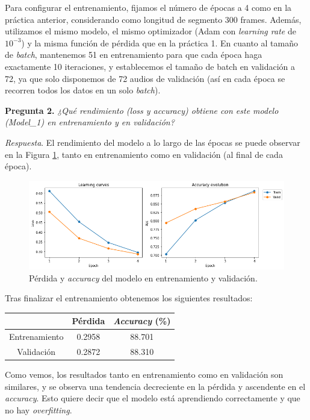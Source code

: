 \documentclass[11pt]{article}
\begin{document}
Para configurar el entrenamiento, fijamos el número de épocas a 4 como en la práctica anterior, considerando como longitud de segmento 300 frames. Además, utilizamos el mismo modelo, el mismo optimizador (Adam con \textit{learning rate} de $10^{-3}$) y la misma función de pérdida que en la práctica 1. En cuanto al tamaño de \textit{batch}, mantenemos 51 en entrenamiento para que cada época haga exactamente 10 iteraciones, y establecemos el tamaño de batch en validación a 72, ya que solo disponemos de 72 audios de validación (así en cada época se recorren todos los datos en un solo \textit{batch}).

\textbf{Pregunta 2.} \textit{¿Qué rendimiento (loss y accuracy) obtiene con este modelo (Model\_1) en entrenamiento y en validación? }

\textit{Respuesta}. El rendimiento del modelo a lo largo de las épocas se puede observar en la Figura \ref{fig:1}, tanto en entrenamiento como en validación (al final de cada época).

\begin{figure}[h!]
  \centering
  \includegraphics[width=\textwidth]{img/1_learning_curves}
  \caption{Pérdida y \textit{accuracy} del modelo en entrenamiento y validación.}
  \label{fig:1}
\end{figure}

Tras finalizar el entrenamiento obtenemos los siguientes resultados:
\newpage

\begin{table}[h!]
  \centering
  \begin{tabular}{c|cc}
     & Pérdida & \textit{Accuracy} (\%)\\
    \hline
    Entrenamiento & 0.2958 & 88.701\\
    Validación & 0.2872 & 88.310\\
  \end{tabular}
\end{table}

Como vemos, los resultados tanto en entrenamiento como en validación son similares, y se observa una tendencia decreciente en la pérdida y ascendente en el \textit{accuracy}. Esto quiere decir que el modelo está aprendiendo correctamente y que no hay \textit{overfitting}.
\end{document}

